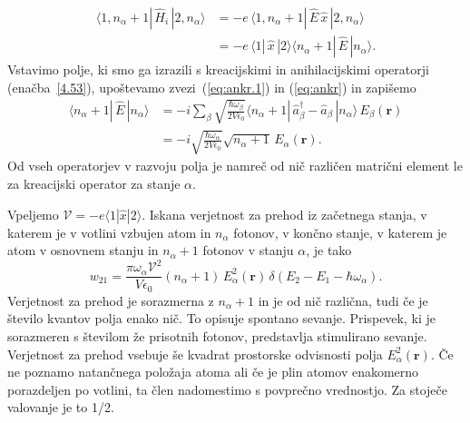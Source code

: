 \begin{align}
\langle1,n_{\alpha}+1|\,\hat{H}_{i}\,|2,n_{\alpha}\rangle & =  -e\,
\langle1,n_{\alpha}+1|\,\hat{E}\,\hat{x}\,|2,n_{\alpha}\rangle \\
 & =  -e\,\langle1|\,\hat{x}\,|2\rangle\langle n_{\alpha}+1|\,\hat{E}\,|n_{\alpha}\rangle.
\end{align}
Vstavimo polje, ki smo ga izrazili s kreacijskimi in anihilacijskimi operatorji (enačba~\ref{4.53}),
upoštevamo zvezi~(\ref{eq:ankr.1}) in (\ref{eq:ankr}) in zapišemo
\begin{align}
\langle n_{\alpha}+1|\, \hat{E}\,|n_{\alpha}\rangle & = 
 -i\sum_{\beta}\sqrt{\frac{\hbar\omega_{\beta}}{2V\epsilon_{0}}}
\langle n_{\alpha}+1|\,\hat{a}_{\beta}^{\dagger}-\hat{a}_{\beta}\,|n_{\alpha}\rangle\, 
E_{\beta}(\mathbf{r})\nonumber \\
 & =  -i\sqrt{\frac{\hbar\omega_{\alpha}}{2V\epsilon_{0}}}
 \sqrt{n_{\alpha}+1}\, E_{\alpha}(\mathbf{r}).
\end{align}
Od vseh operatorjev v razvoju polja je namreč od nič različen matrični
element le za kreacijski operator za stanje $\alpha$.

Vpeljemo $\mathcal{V} = -e \langle1|\hat{x}|2\rangle$.
 Iskana verjetnost za prehod iz 
začetnega stanja, v katerem je v votlini vzbujen atom in $n_{\alpha}$ fotonov, v končno
stanje, v katerem je atom v osnovnem stanju in $n_{\alpha}+1$ fotonov v stanju $\alpha$, je tako
\begin{equation}
w_{21}=\frac{\pi \omega_{\alpha}\mathcal{V}^{2}}{V\epsilon_{0}}
(n_{\alpha}+1)\,E_{\alpha}^{2}(\mathbf{r})\,\delta(E_{2}-E_{1}-\hbar\omega_{\alpha}).
\label{4.56}
\end{equation}
Verjetnost za prehod je sorazmerna z $n_{\alpha}+1$ in je od nič
različna, tudi če je število kvantov polja enako nič. To opisuje 
spontano sevanje. Prispevek, ki je 
sorazmeren s številom že prisotnih fotonov, predstavlja stimulirano 
sevanje. Verjetnost za prehod vsebuje
še kvadrat prostorske odvisnosti polja $E_{\alpha}^{2}(\mathbf{r})$.
Če ne poznamo natančnega položaja atoma ali če je plin atomov enakomerno
porazdeljen po votlini, ta člen nadomestimo s povprečno vrednostjo.
Za stoječe valovanje je to 1/2.

